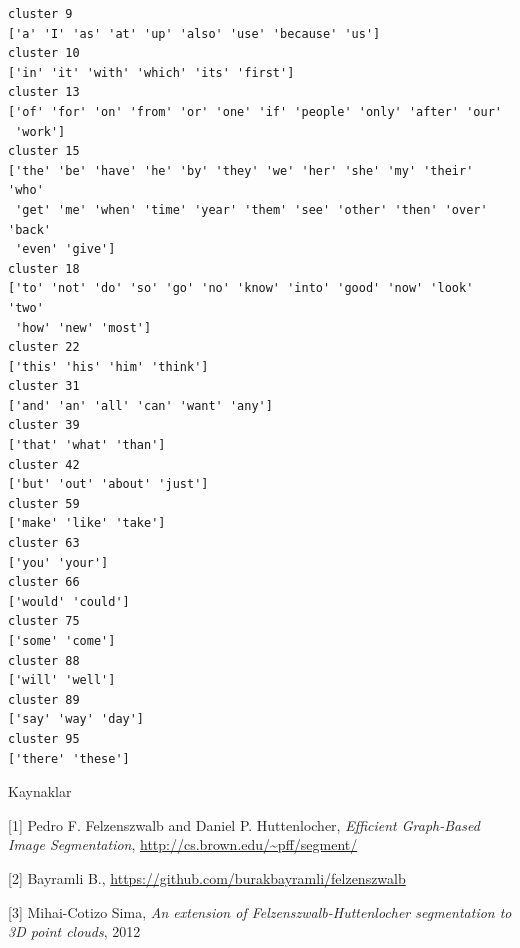 \documentclass[12pt,fleqn]{article}\usepackage{../common}
\begin{document}
\begin{verbatim}
cluster 9
['a' 'I' 'as' 'at' 'up' 'also' 'use' 'because' 'us']
cluster 10
['in' 'it' 'with' 'which' 'its' 'first']
cluster 13
['of' 'for' 'on' 'from' 'or' 'one' 'if' 'people' 'only' 'after' 'our'
 'work']
cluster 15
['the' 'be' 'have' 'he' 'by' 'they' 'we' 'her' 'she' 'my' 'their' 'who'
 'get' 'me' 'when' 'time' 'year' 'them' 'see' 'other' 'then' 'over' 'back'
 'even' 'give']
cluster 18
['to' 'not' 'do' 'so' 'go' 'no' 'know' 'into' 'good' 'now' 'look' 'two'
 'how' 'new' 'most']
cluster 22
['this' 'his' 'him' 'think']
cluster 31
['and' 'an' 'all' 'can' 'want' 'any']
cluster 39
['that' 'what' 'than']
cluster 42
['but' 'out' 'about' 'just']
cluster 59
['make' 'like' 'take']
cluster 63
['you' 'your']
cluster 66
['would' 'could']
cluster 75
['some' 'come']
cluster 88
['will' 'well']
cluster 89
['say' 'way' 'day']
cluster 95
['there' 'these']
\end{verbatim}


Kaynaklar

[1] Pedro F. Felzenszwalb and Daniel P. Huttenlocher, {\em Efficient
  Graph-Based Image Segmentation}, \url{http://cs.brown.edu/~pff/segment/}

[2] Bayramli B., \url{https://github.com/burakbayramli/felzenszwalb}

[3] Mihai-Cotizo Sima, {\em An extension of Felzenszwalb-Huttenlocher
  segmentation to 3D point clouds}, 2012
\end{document}
